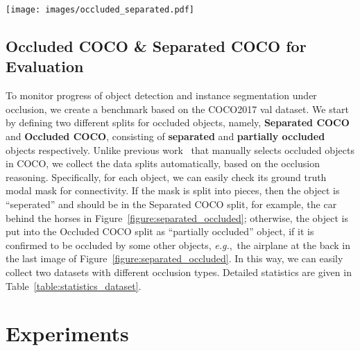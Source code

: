 \documentclass{bmvc2k}
\begin{document}
\begin{figure*}[t]
		\centering
		\texttt{[image: images/occluded\_separated.pdf]}
		\caption{\textcolor{bmvc_blue}{\textbf{Examples in generated training and testing datasets.} Left: Example of a target object with its occluder and occludee. Right: Examples of automatically picked objects for Separated COCO and Occluded COCO. More examples are in appendix.}}
		\label{figure:separated_occluded}
 		\vspace{-4mm}
\end{figure*}

\vspace{-0.2cm}
\subsection{Occluded COCO \& Separated COCO for Evaluation}
\label{sec:occluded_separated}
\vspace{-0.1cm}

To monitor progress of object detection and instance segmentation under occlusion, 
we create a benchmark based on the COCO2017 val dataset.
We start by defining two different splits for occluded objects, 
namely, \textbf{Separated COCO} and \textbf{Occluded COCO}, consisting of \textbf{separated} and \textbf{partially occluded} objects respectively.
Unlike previous work~\cite{wang2020robust} that manually selects occluded objects in COCO, 
we collect the data splits automatically, based on the occlusion reasoning.
Specifically, for each object, we can easily check its ground truth modal mask for connectivity. 
If the mask is split into pieces, then the object is ``seperated'' and should be in the Separated COCO split,
for example, the car behind the horses in Figure~\ref{figure:separated_occluded};
otherwise, the object is put into the Occluded COCO split as ``partially occluded'' object, if it is confirmed to be occluded by some other objects, 
{\em e.g.},~the airplane at the back in the last image of Figure~\ref{figure:separated_occluded}.
In this way, we can easily collect two datasets with different occlusion types.
Detailed statistics are given in Table~\ref{table:statistics_dataset}.


 \vspace{-0.2cm}
\section{Experiments}
\vspace{-0.1cm}
\end{document}
